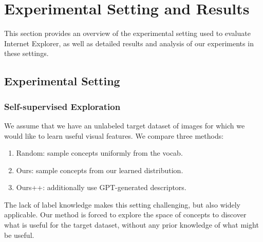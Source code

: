 \chapter{Experimental Setting and Results}
This section provides an overview of the experimental setting used to evaluate Internet Explorer, as well as detailed results and analysis of our experiments in these settings.

\section{Experimental Setting}
\subsection{Self-supervised Exploration}
We assume that we have an unlabeled target dataset of images for which we would like to learn useful visual features. We compare three methods:
\begin{enumerate}
    \item Random: sample concepts uniformly from the vocab. 
    \item Ours: sample concepts from our learned distribution. 
    \item Ours++: additionally use GPT-generated descriptors.
\end{enumerate}
The lack of label knowledge makes this setting challenging, but also widely applicable. Our method is forced to explore the space of concepts to discover what is useful for the target dataset, without any prior knowledge of what might be useful.

